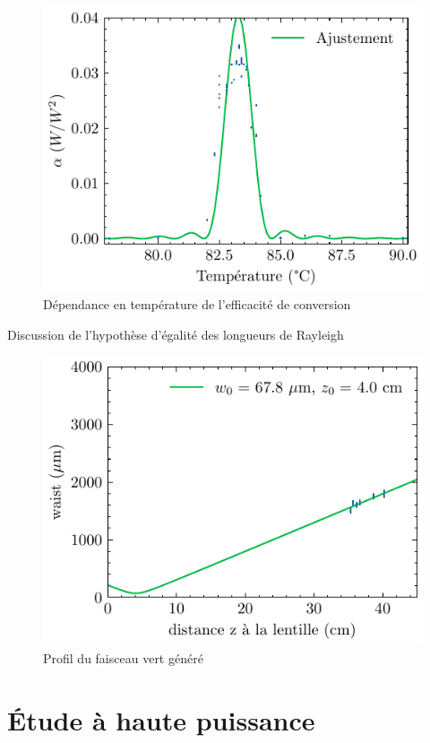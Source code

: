 \documentclass[11pt,a4paper] { article}
\begin{document}
\begin{figure}[h]
	\centering
	\includegraphics{./img/alpha bp.pdf}
	\caption{Dépendance en température de l'efficacité de conversion}
	\label{fig:alphabp}
\end{figure}

Discussion de l'hypothèse d'égalité des longueurs de Rayleigh

\begin{figure}[h]
	\centering
	\includegraphics{./img/waist faisceau vert.pdf}
	\caption{Profil du faisceau vert généré}
	\label{fig:vert}
\end{figure}

\section{Étude à haute puissance}
\end{document}
